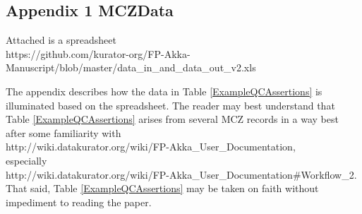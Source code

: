 \begin{appendices}
\large
\section*{Appendix 1 MCZData}
\normalsize
Attached is a spreadsheet
\\\hspace{0.25in} https://github.com/kurator-org/FP-Akka-Manuscript/blob/master/data\_in\_and\_data\_out\_v2.xls 


The appendix describes how the data in Table \ref{ExampleQCAssertions} is illuminated based on the spreadsheet. The reader may best understand
that Table \ref{ExampleQCAssertions}
arises
from several MCZ records in a way best after some 
familiarity with 
\\\hspace{0.25in} http://wiki.datakurator.org/wiki/FP-Akka\_User\_Documentation, 
\\especially 
\\\hspace{0.25in} http://wiki.datakurator.org/wiki/FP-Akka\_User\_Documentation\#Workflow\_2.
\\That said, 
Table \ref{ExampleQCAssertions} may be taken on faith without impediment to reading the paper.
\end{appendices}

